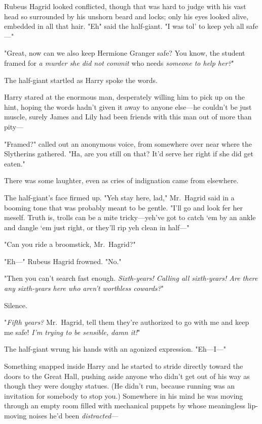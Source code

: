 Rubeus Hagrid looked conflicted, though that was hard to judge with his vast
head so surrounded by his unshorn beard and locks; only his eyes looked alive,
embedded in all that hair. "Eh{\el}" said the half-giant. "I was tol' to
keep yeh all safe\mbox{---}"

"Great, now can we also keep Hermione Granger safe? You know, the student
framed for \emph{a murder she did not commit} who needs \emph{someone to help
her?}"

The half-giant startled as Harry spoke the words.

Harry stared at the enormous man, desperately willing him to pick up on the
hint, hoping the words hadn't given it away to anyone else---he couldn't be
just muscle, surely James and Lily had been friends with this man out of more
than pity---

"Framed?" called out an anonymous voice, from somewhere over near where the
Slytherins gathered. "Ha, are you still on that? It'd serve her right if she
did get eaten."

There was some laughter, even as cries of indignation came from elsewhere.

The half-giant's face firmed up. "Yeh stay here, lad," Mr.~Hagrid said in a
booming tone that was probably meant to be gentle. "I'll go and look fer her
meself. Truth is, trolls can be a mite tricky---yeh've got to catch `em by an
ankle and dangle `em just right, or they'll rip yeh clean in half\mbox{---}"

"Can you ride a broomstick, Mr.~Hagrid?"

"Eh\mbox{---}" Rubeus Hagrid frowned. "No."

"Then you can't search fast enough. \emph{Sixth-years! Calling all sixth-years!
Are there any sixth-years here who aren't worthless cowards?}"

Silence.

"\emph{Fifth years?} Mr.~Hagrid, tell them they're authorized to go with me and
keep me safe! \emph{I'm trying to be sensible, damn it!}"

The half-giant wrung his hands with an agonized expression. "Eh---I\mbox{---}"

Something snapped inside Harry and he started to stride directly toward the
doors to the Great Hall, pushing aside anyone who didn't get out of his way as
though they were doughy statues. (He didn't run, because running was an
invitation for somebody to stop you.) Somewhere in his mind he was moving
through an empty room filled with mechanical puppets by whose meaningless
lip-moving noises he'd been \emph{distracted}---

